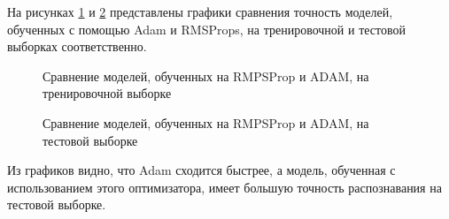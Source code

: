 На рисунках \ref{img:adam_rmsprops_training} и \ref{img:adam_rmsprops_test} представлены графики сравнения точность моделей, обученных с помощью Adam и RMSProps, на тренировочной и тестовой выборках соответственно.

\begin{figure}[H]
	\begin{center}
		\caption{Сравнение моделей, обученных на RMPSProp и ADAM, на тренировочной выборке}
		\label{img:adam_rmsprops_training}
	\end{center}
\end{figure}
\begin{figure}[H]
	\begin{center}
		\caption{Сравнение моделей, обученных на RMPSProp и ADAM, на тестовой выборке}
		\label{img:adam_rmsprops_test}
	\end{center}
\end{figure}

Из графиков видно, что Adam сходится быстрее, а модель, обученная с использованием этого оптимизатора, имеет большую точность распознавания на тестовой выборке.


